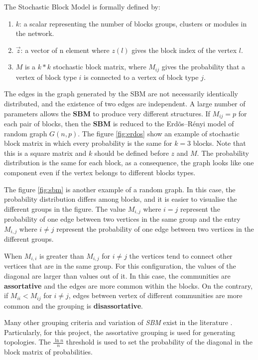 The Stochastic Block Model is formally defined by: 
\begin{enumerate}

    \item $k$: a scalar representing the number of blocks groups, clusters or modules in the network.
    \item $\overrightarrow{z}$: a vector of n element where $z(l)$ gives the block index of the vertex $l$.
    \item $M$ is a $k * k$ stochastic block matrix, where $M_{ij}$ gives the probability that a vertex of block type $i$ is connected to a vertex of block type $j$.
\end{enumerate}



The edges in the graph generated by the SBM are not necessarily identically distributed, and the existence of two edges are independent. A large number of parameters allows the \textbf{SBM} to produce very different structures. If $M_{ij} = p$ for each pair of blocks, then the \textbf{SBM} is reduced to the Erd\~os--R\'enyi model of random graph $G(n,p)$. The figure \ref{fig:erdos} show an example of stochastic block matrix in which every probability is the same for $k = 3$ blocks. Note that this is a square matrix and $k$ should be defined before $z$ and $M$. The probability distribution is the same for each block, as a consequence, the graph looks like one component even if the vertex belongs to different blocks types.

 The figure \ref{fig:sbm} is another example of a random graph. In this case, the probability distribution differs among blocks, and it is easier to visualise the different groups in the figure. The value $M_{i,j}$ where $i = j$ represent the probability of one edge between two vertices in the same group and the entry $M_{i,j}$ where $i \neq j$ represent the probability of one edge between two vertices in the different groups. 

When $M_{i,i}$ is greater than $M_{i,j}$ for $i \neq j$ the vertices tend to connect other vertices that are in the same group. For this configuration, the values of the diagonal are larger than values out of it. In this case, the communities are \textbf{assortative} and the edges are more common within the blocks. On the contrary, if $M_{ii} <  M_{ij}$ for $i \neq j$, edges between vertex of different communities are more common and the grouping is \textbf{disassortative}.


Many other grouping criteria and variation of \textit{SBM} exist in the literature \cite{carrington2005models,holland1983stochastic,airoldi2008mixed}. Particularly, for this project, the assortative grouping is used for generating topologies. The ${\tfrac {\ln n}{n}}$ threshold is used to set the probability of the diagonal in the block matrix of probabilities. 

